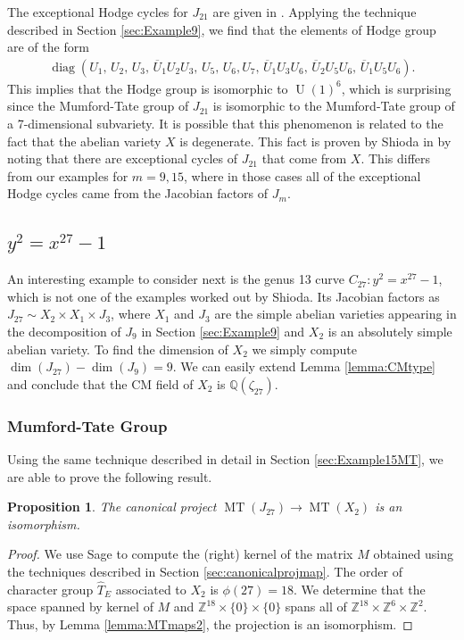 \documentclass[reqno, oneside, 12pt]{amsart}
\DeclareMathOperator{\U}{U}
\DeclareMathOperator{\diag}{diag}
\DeclareMathOperator{\MT}{MT}
\newcommand{\Z}{\mathbb{Z}}
\newcommand{\Q}{\mathbb{Q}}
\newtheorem{proposition}[theorem]{Proposition}
\theoremstyle{remark}
\numberwithin{equation}{section}
\begin{document}
The exceptional Hodge cycles for $J_{21}$ are given in \cite[Section 6]{Shioda82}. Applying the technique described in Section \ref{sec:Example9}, we find that the elements of  Hodge group are of the form  
\begin{align*}
    \diag(U_1,\,U_2,\,U_3,\,\overline U_1U_2U_3,\,U_5,\, U_6, U_7,\,\overline U_1U_3U_6,\, \overline U_2 U_5U_6, \,\overline U_1U_5U_6).
\end{align*}
This implies that the Hodge group is isomorphic to $\U(1)^6$, which is surprising since the Mumford-Tate group of $J_{21}$ is isomorphic to the Mumford-Tate group of a 7-dimensional subvariety. It is possible that this phenomenon is related to the fact that the abelian variety $X$ is degenerate. This fact is proven by Shioda in \cite[Section 6]{Shioda82} by noting that there are exceptional cycles of $J_{21}$ that come from $X$. This differs from our examples for $m=9, 15$, where in those cases all of the exceptional Hodge cycles came from the Jacobian factors of $J_m$.  




\subsection{$y^2=x^{27}-1$}\label{sec:Example27}


An interesting example to consider next is the genus 13 curve $C_{27}\colon y^2=x^{27}-1$, which is not one of the examples worked out by Shioda. Its Jacobian factors as $J_{27}\sim X_2 \times X_1 \times J_3$, where $X_1$ and $J_3$ are the simple abelian varieties appearing in the decomposition of $J_9$ in Section \ref{sec:Example9} and $X_2$ is an absolutely simple abelian variety. To find the dimension of $X_2$ we simply compute $\dim(J_{27})-\dim(J_9)=9$. We can easily extend Lemma \ref{lemma:CMtype} and conclude that the CM field of $X_2$ is $\Q(\zeta_{27})$. 

\subsubsection{Mumford-Tate Group}
Using the same technique described in detail in Section \ref{sec:Example15MT}, we are able to prove the following result.

\begin{proposition}\label{prop:MT27isomorphism}
The canonical project $\MT(J_{27}) \to \MT(X_2)$ is an isomorphism.
\end{proposition}
\begin{proof}
We use Sage to  compute the (right) kernel of the matrix $M$ obtained using the techniques described in Section \ref{sec:canonicalprojmap}. The order of  character group $\widehat{T}_E$ associated to $X_2$ is $\phi(27)=18$. We determine that the space spanned by kernel of $M$ and $\Z^{18}\times \{0\}\times \{0\}$ spans all of  $\Z^{18}\times\Z^6\times \Z^2$. Thus, by Lemma \ref{lemma:MTmaps2}, the projection is an isomorphism. 
\end{proof}
\end{document}
